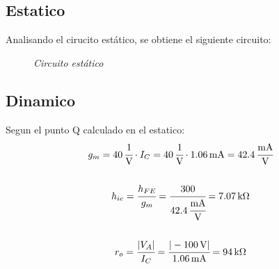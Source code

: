 \documentclass[a4paper,12pt]{article}
\newcommand{\mR}[1]{\SI{#1}{\kilo\ohm}}
\newcommand{\mI}[1]{\SI{#1}{\milli\ampere}}
\newcommand{\mV}[1]{\SI{#1}{\volt}}
\begin{document}
\subsection{Estatico}
    Analisando el cirucito estático, se obtiene el siguiente circuito:
    \begin{figure}[H]
        \setlength{\abovecaptionskip}{0pt}
		\centering
		\captionsetup{labelformat=empty}
		\caption{\small{\textit{ Circuito estático }}}
    \end{figure}


\subsection{Dinamico}
    Segun el punto Q calculado en el estatico:
    \begin{gather*}
        g_m = \SI{40}{\cfrac{1}{\volt}} \cdot I_C = \SI{40}{\cfrac{1}{\volt}} \cdot \mI{1.06} = \SI{42.4}{\cfrac{mA}{V}}
        \\ \\
        h_{ie} = \cfrac{h_{FE}}{g_m} = \cfrac{300}{\SI{42.4}{\cfrac{mA}{V}}} = \mR{7.07}
        \\ \\
        r_o = \cfrac{| V_A |}{I_C} = \cfrac{|\mV{-100}|}{\mI{1.06}} = \mR{94}
    \end{gather*}
\end{document}
